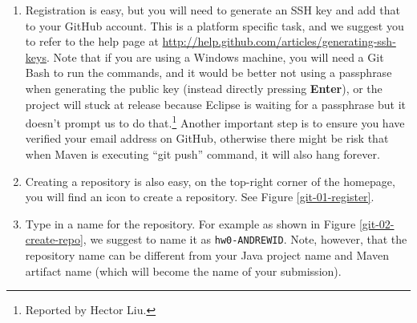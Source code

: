 \begin{enumerate}

\item Registration is easy, but you will need to generate an SSH key and add
that to your GitHub account. This is a platform specific task, and we suggest
you to refer to the help page at
\url{http://help.github.com/articles/generating-ssh-keys}. Note that if you are
using a Windows machine, you will need a Git Bash to run the commands, and it
would be better not using a passphrase when generating the public key (instead
directly pressing \textbf{Enter}), or the project will stuck at release because
Eclipse is waiting for a passphrase but it doesn't prompt us to do
that.\footnote{Reported by Hector Liu.} Another important step is to ensure you
have verified your email address on GitHub, otherwise there might be risk that
when Maven is executing ``git push'' command, it will also hang forever.


\item Creating a repository is also easy, on the top-right corner of the
homepage, you will find an icon to create a repository. See Figure
\ref{git-01-register}.

\item Type in a name for the repository. For example as shown in Figure
\ref{git-02-create-repo}, we suggest to name it as \texttt{hw0-ANDREWID}. 
Note, however, that the repository name can be different from your Java
project name and Maven artifact name (which will become the name of your
submission). 


\end{enumerate}
